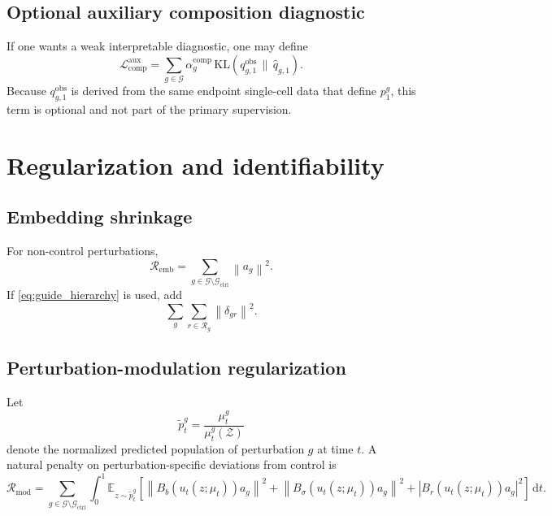 \documentclass[11pt]{article}
\newcommand{\E}{\mathbb{E}}
\newcommand{\dd}{\,\mathrm{d}}
\newcommand{\KL}{\mathrm{KL}}
\newcommand{\Gcal}{\mathcal{G}}
\newcommand{\Gctrl}{\mathcal{G}_{\mathrm{ctrl}}}
\newcommand{\Zcal}{\mathcal{Z}}
\newcommand{\norm}[1]{\left\lVert #1 \right\rVert}
\newcommand{\abs}[1]{\left\lvert #1 \right\rvert}
\begin{document}
\subsection{Optional auxiliary composition diagnostic}

If one wants a weak interpretable diagnostic, one may define
\begin{equation}
\mathcal{L}_{\mathrm{comp}}^{\mathrm{aux}}
=
\sum_{g\in\Gcal}
\alpha_g^{\mathrm{comp}}
\,\KL\!\left(q_{g,1}^{\mathrm{obs}}\,\|\,\hat q_{g,1}\right).
\label{eq:L_comp_aux}
\end{equation}
Because $q_{g,1}^{\mathrm{obs}}$ is derived from the same endpoint single-cell data that define $p_1^g$, this term is optional and not part of the primary supervision.

\section{Regularization and identifiability}

\subsection{Embedding shrinkage}

For non-control perturbations,
\begin{equation}
\mathcal{R}_{\mathrm{emb}}
=
\sum_{g\in\Gcal\setminus\Gctrl}\norm{a_g}^2.
\label{eq:R_emb}
\end{equation}
If \cref{eq:guide_hierarchy} is used, add
\begin{equation}
\sum_g \sum_{r\in\mathcal{R}_g}\norm{\delta_{gr}}^2.
\label{eq:R_sgrna}
\end{equation}

\subsection{Perturbation-modulation regularization}

Let
\[
\tilde p_t^g = \frac{\mu_t^g}{\mu_t^g(\Zcal)}
\]
denote the normalized predicted population of perturbation $g$ at time $t$. A natural penalty on perturbation-specific deviations from control is
\begin{equation}
\mathcal{R}_{\mathrm{mod}}
=
\sum_{g\in\Gcal\setminus\Gctrl}
\int_0^1
\E_{z\sim \tilde p_t^g}
\left[
\norm{B_b(u_t(z;\mu_t))a_g}^2
+
\norm{B_\sigma(u_t(z;\mu_t))a_g}^2
+
\abs{B_r(u_t(z;\mu_t))a_g}^2
\right]
\dd t.
\label{eq:R_mod}
\end{equation}
\end{document}
